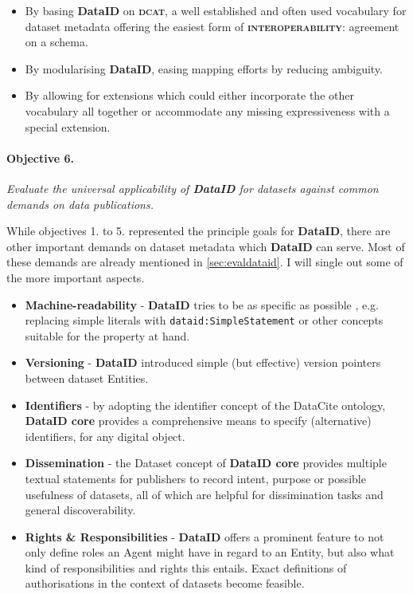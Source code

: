 \documentclass[a4paper,english,twoside,BCOR1.5cm,headsepline,DIV12,appendixprefix,final,12pt]{scrbook}
\newcommand{\interoperability}{{\ttfamily\scshape\bfseries interoperability}\xspace}
\newcommand{\dataid}{{\ttfamily\bfseries DataID}\xspace}
\newcommand{\core}{{\ttfamily\bfseries DataID core}\xspace}
\newcommand{\dcat}{{\scshape\bfseries dcat}\xspace}
\newcommand{\prop}[1]{{{\texttt{#1}}}}
\begin{document}
\begin{itemize}
\item By basing \dataid on \dcat, a well established and often used vocabulary for dataset metadata offering the easiest form of \interoperability: agreement on a schema.
\item By modularising \dataid, easing mapping efforts by reducing ambiguity. 
\item By allowing for extensions which could either incorporate the other vocabulary all together or accommodate any missing expressiveness with a special extension.
\end{itemize}

\paragraph{Objective 6.} \textit{Evaluate the universal applicability of \dataid for datasets against common demands on data publications.}

While objectives 1. to 5. represented the principle goals for \dataid, there are other important demands on dataset metadata which \dataid can serve. Most of these demands are already mentioned in \cref{sec:evaldataid}. I will single out some of the more important aspects.

\begin{itemize}
\item \textbf{Machine-readability} - \dataid tries to be as specific as possible , e.g. replacing simple literals with \prop{dataid:SimpleStatement} or other concepts suitable for the property at hand.
\item \textbf{Versioning} - \dataid introduced simple (but effective) version pointers between dataset Entities.
\item \textbf{Identifiers} - by adopting the identifier concept of the DataCite ontology, \core provides a comprehensive means to specify (alternative) identifiers, for any digital object.
\item \textbf{Dissemination} - the Dataset concept of \core provides multiple textual statements for publishers to record intent, purpose or possible usefulness of datasets, all of which are helpful for dissimination tasks and general discoverability.
\item \textbf{Rights \& Responsibilities} - \dataid offers a prominent feature to not only define roles an Agent might have in regard to an Entity, but also what kind of responsibilities and rights this entails.
Exact definitions of authorisations in the context of datasets become feasible.
\end{itemize}
\end{document}
